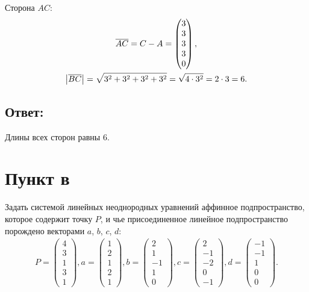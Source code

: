\documentclass[12pt]{article}
\begin{document}
    Сторона $AC$:
    \begin{gather*}
        \overline{AC}
        = C - A
        = \begin{pmatrix}
              3 \\ 3 \\ 3 \\ 3 \\ 0
        \end{pmatrix}, \\
        \left | \overline{BC} \right |
        = \sqrt{3^2 + 3^2 + 3^2 + 3^2}
        = \sqrt{4 \cdot 3^2}
        = 2 \cdot 3
        = 6 .
    \end{gather*}

    \subsection*{Ответ:}
    Длины всех сторон равны 6.

    \section*{Пункт в}
    Задать системой линейных неоднородных уравнений аффинное подпространство, которое содержит точку $P$, и чье присоединенное линейное подпространство порождено векторами $a$, $b$,
    $c$, $d$:
    \begin{gather*}
        P =
        \begin{pmatrix}
            4 \\ 3 \\ 1 \\ 3 \\ 1
        \end{pmatrix},
        a =
        \begin{pmatrix}
            1 \\ 2 \\ 1 \\ 2 \\ 1
        \end{pmatrix},
        b =
        \begin{pmatrix}
            2 \\ 1 \\ -1 \\ 1 \\ 0
        \end{pmatrix},
        c =
        \begin{pmatrix}
            2 \\ -1 \\ -2 \\ 0 \\ -1
        \end{pmatrix},
        d =
        \begin{pmatrix}
            -1 \\ -1 \\ 1 \\ 0 \\ 0
        \end{pmatrix}.
    \end{gather*}
\end{document}
